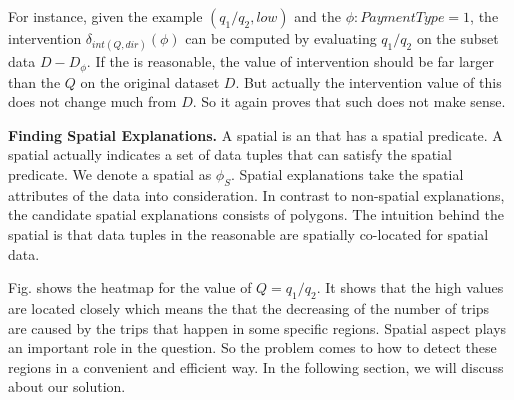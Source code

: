 For instance, given the example {\fact} $(q_1/q_2, low)$ and the {\explanation} $\phi: PaymentType = 1$, the intervention $\delta_{int(Q, dir)}(\phi)$ can be computed by evaluating $q_1/q_2$ on the subset data $D-D_\phi$. If the {\explanation} is reasonable, the value of intervention should be far larger than the $Q$ on the original dataset $D$. But actually the intervention value of this {\explanation} does not change much from $D$. So it again proves that such {\explanation} does not make sense.

{\bf Finding Spatial Explanations.}
A spatial {\explanation} is an {\explanation} that has a spatial predicate. A spatial {\explanation} actually indicates a set of data tuples that can satisfy the spatial predicate. We denote a spatial {\explanation} as $\phi_S$.
Spatial explanations take the spatial attributes of the data into consideration. In contrast to non-spatial explanations, the candidate spatial explanations consists of polygons. 
The intuition behind the spatial {\explanation} is that data tuples in the reasonable {\explanation} are spatially co-located for spatial data.



Fig. shows the heatmap for the value of $Q = q_1 / q_2$. It shows that the high values are located closely which means the {\fact} that the decreasing of the number of trips are caused by the trips that happen in some specific regions. Spatial aspect plays an important role in the {\fact} {\explanation} question. So the problem comes to how to detect these regions in a convenient and efficient way. In the following section, we will discuss about our solution.

